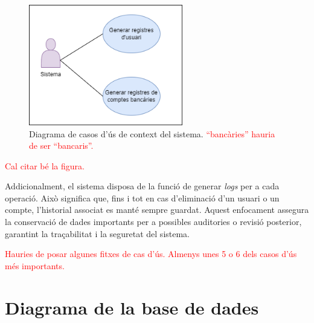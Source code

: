\documentclass[a4paper,12pt,twoside]{ThesisStyle}
\newcommand{\pau}[1]{\textcolor{red}{#1}}
\begin{document}
\begin{figure}[h]
    \centering
    \includegraphics[width=0.6\textwidth]{imatges/logs.png}
    \caption{Diagrama de casos d'ús de context del sistema. \pau{``bancàries'' hauria de ser ``bancaris''.}}
    \label{fig:Diagrama de Casos d'Ús de Context del sistema}
\end{figure}

\pau{Cal citar bé la figura.}


Addicionalment, el sistema disposa de la funció de generar \textit{logs} per a cada operació. Això significa que, fins i tot en cas d'eliminació d'un usuari o un compte, l'historial associat es manté sempre guardat. Aquest enfocament assegura la conservació de dades importants per a possibles auditories o revisió posterior, garantint la traçabilitat i la seguretat del sistema.

\pau{Hauries de posar algunes fitxes de cas d'ús. Almenys unes 5 o 6 dels casos d'ús més importants.}

\section{Diagrama de la base de dades}
\label{sec: diagrama de base de dades}
\end{document}
